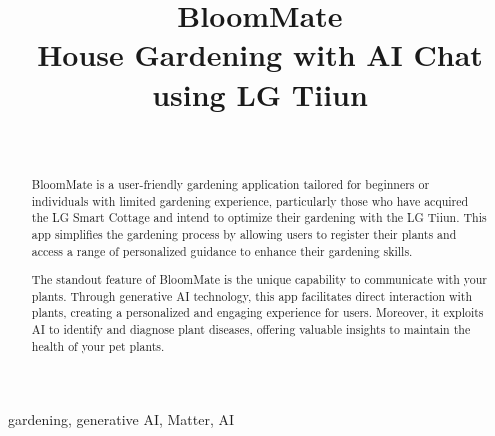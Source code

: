 \documentclass[conference, a4paper]{IEEEtran}
\begin{document}
\title{BloomMate\\{\small House Gardening with AI Chat using LG Tiiun  }}


\author{
\\
\and
{}
\and
{}
\and
{}
}





\maketitle
\thispagestyle{plain}
\pagestyle{plain}
\begin{abstract}
BloomMate is a user-friendly gardening application tailored for beginners or individuals with limited gardening experience, particularly those who have acquired the LG Smart Cottage and intend to optimize their gardening with the LG Tiiun. This app simplifies the gardening process by allowing users to register their plants and access a range of personalized guidance to enhance their gardening skills.

The standout feature of BloomMate is the unique capability to communicate with your plants. Through generative AI technology, this app facilitates direct interaction with plants, creating a personalized and engaging experience for users. Moreover, it exploits AI to identify and diagnose plant diseases, offering valuable insights to maintain the health of your pet plants.\\
\end{abstract}
\begin{IEEEkeywords}
gardening, generative AI, Matter, AI\\
\end{IEEEkeywords}
\newpage
\end{document}
